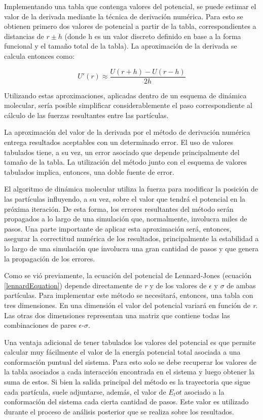 Implementando una tabla que contenga valores del potencial, se puede estimar el valor de la derivada mediante la técnica de derivación numérica. 
Para esto se obtienen primero dos valores de potencial a partir de la tabla, correspondientes a distancias de $r\pm h$ (donde h es un valor discreto definido en base a la forma funcional y el tamaño total de la tabla).
La aproximación de la derivada se calcula entonces como:

\begin{equation}
 U'(r) \approx \frac{U(r+h)-U(r-h)}{2h}
\end{equation}

Utilizando estas aproximaciones, aplicadas dentro de un esquema de dinámica molecular, sería posible simplificar considerablemente el paso correspondiente al cálculo de las fuerzas resultantes entre las partículas.

La aproximación del valor de la derivada por el método de derivación numérica entrega resultados aceptables con un determinado error. 
El uso de valores tabulados tiene, a su vez, un error asociado que depende principalmente del tamaño de la tabla.
La utilización del método junto con el esquema de valores tabulados implica, entonces, una doble fuente de error. 

El algoritmo de dinámica molecular utiliza la fuerza para modificar la posición de las partículas influyendo, a su vez, sobre el valor que tendrá el potencial en la próxima iteración. 
De esta forma, los errores resultantes del método serán propagados a lo largo de una simulación que, normalmente, involucra miles de pasos.
Una parte importante de aplicar esta aproximación será, entonces, asegurar la correctitud numérica de los resultados, 
principalmente la estabilidad a lo largo de una simulación que involucra una gran cantidad de pasos y que genera la propagación de los errores.


Como se vió previamente, la ecuación del potencial de Lennard-Jones (ecuación \ref{lennardEquation}) depende directamente de \textit{r} y de los valores de $\epsilon$ y $\sigma$ de ambas partículas.
Para implementar este método se necesitará, entonces, una tabla con tres dimensiones. En una dimensión el valor del potencial variará en función de \textit{r}.
Las otras dos dimensiones representan una matriz que contiene todas las combinaciones de pares $\epsilon$-$\sigma$.

Una ventaja adicional de tener tabulados los valores del potencial es que permite calcular muy fácilmente el valor de la energía potencial total asociada a una conformación puntual del sistema.
Para esto solo se debe recuperar los valores de la tabla asociados a cada interacción encontrada en el sistema y luego obtener la suma de estos.
Si bien la salida principal del método es la trayectoria que sigue cada partícula, suele adjuntarse, además, el valor de $E_tot$ asociado a la conformación del sistema cada cierta cantidad de pasos. 
Este valor es utilizado durante el proceso de análisis posterior que se realiza sobre los resultados.



